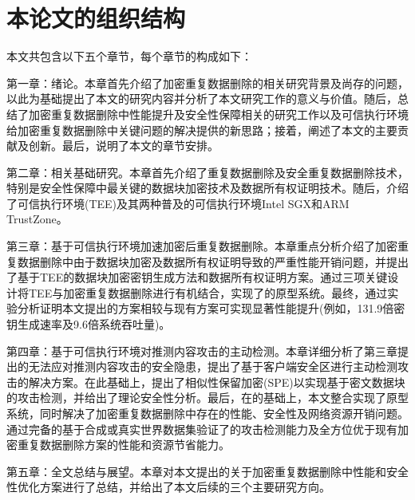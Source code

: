 \section{本论文的组织结构}
本文共包含以下五个章节，每个章节的构成如下：

第一章：绪论。本章首先介绍了加密重复数据删除的相关研究背景及尚存的问题，以此为基础提出了本文的研究内容并分析了本文研究工作的意义与价值。随后，总结了加密重复数据删除中性能提升及安全性保障相关的研究工作以及可信执行环境给加密重复数据删除中关键问题的解决提供的新思路；接着，阐述了本文的主要贡献及创新。最后，说明了本文的章节安排。

第二章：相关基础研究。本章首先介绍了重复数据删除及安全重复数据删除技术，特别是安全性保障中最关键的数据块加密技术及数据所有权证明技术。随后，介绍了可信执行环境(TEE)及其两种普及的可信执行环境Intel SGX和ARM TrustZone。

第三章：基于可信执行环境加速加密后重复数据删除。本章重点分析介绍了加密重复数据删除中由于数据块加密及数据所有权证明导致的严重性能开销问题，并提出了基于TEE的数据块加密密钥生成方法和数据所有权证明方案。通过三项关键设计将TEE与加密重复数据删除进行有机结合，实现了\sysnameS 的原型系统。最终，通过实验分析证明本文提出的方案相较与现有方案可实现显著性能提升(例如，131.9倍密钥生成速率及9.6倍系统吞吐量)。

第四章：基于可信执行环境对推测内容攻击的主动检测。本章详细分析了第三章提出的\sysnameS 无法应对推测内容攻击的安全隐患，提出了基于客户端安全区进行主动检测攻击的解决方案\sysnameF。在此基础上，提出了相似性保留加密(SPE)以实现基于密文数据块的攻击检测，并给出了理论安全性分析。最后，在\sysnameS 的基础上，本文整合\sysnameF 实现了\prototype 原型系统，同时解决了加密重复数据删除中存在的性能、安全性及网络资源开销问题。通过完备的基于合成或真实世界数据集验证了\sysnameF 的攻击检测能力及\prototype 全方位优于现有加密重复数据删除方案的性能和资源节省能力。

第五章：全文总结与展望。本章对本文提出的关于加密重复数据删除中性能和安全性优化方案进行了总结，并给出了本文后续的三个主要研究方向。
